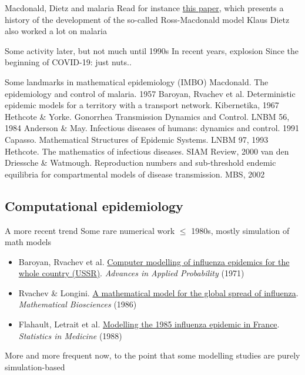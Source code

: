 \documentclass[aspectratio=169]{beamer}\usepackage[]{graphicx}\usepackage[]{xcolor}
\begin{document}
\begin{frame}{Macdonald, Dietz and malaria}
\bbullet Read for instance \href{https://doi.org/10.1371/journal.ppat.1002588}{this paper}, which presents a history of the development of the so-called Ross-Macdonald model
\vfill
\bbullet Klaus Dietz also worked a lot on malaria
\end{frame}
    
    
\begin{frame}{Some activity later, but not much until 1990s}
\bbullet In recent years, explosion
\vfill
\bbullet Since the beginning of COVID-19: just nuts..
\end{frame}

\begin{frame}{Some landmarks in mathematical epidemiology (IMBO)}
\bbullet Macdonald. The epidemiology and control of malaria. 1957
\vfill
\bbullet Baroyan, Rvachev et al. Deterministic epidemic models for a territory with a transport network. Kibernetika, 1967
\vfill
\bbullet Hethcote \& Yorke. Gonorrhea Transmission Dynamics and Control. LNBM 56, 1984
\vfill
\bbullet Anderson \& May. Infectious diseases of humans: dynamics and control. 1991
\vfill
\bbullet Capasso. Mathematical Structures of Epidemic Systems. LNBM 97, 1993
\vfill
\bbullet Hethcote. The mathematics of infectious diseases. SIAM Review, 2000
\vfill
\bbullet van den Driessche \& Watmough. Reproduction numbers and sub-threshold endemic equilibria for compartmental models of disease transmission. MBS, 2002      
\end{frame}


\subsection{Computational epidemiology}


\begin{frame}{A more recent trend}
\bbullet Some rare numerical work $\leq$ 1980s, mostly simulation of math models
\begin{itemize}
    \item Baroyan, Rvachev et al. \href{https://doi.org/10.2307/1426167}{Computer modelling of influenza epidemics for the whole country (USSR)}. \emph{Advances in Applied Probability} (1971) 
    \item Rvachev \& Longini. \href{https://doi.org/10.1016/0025-5564(85)90064-1}{A mathematical model for the global spread of influenza}. \emph{Mathematical Biosciences} (1986) 
    \item Flahault, Letrait et al. \href{https://doi.org/10.1002/sim.4780071107}{Modelling the 1985 influenza epidemic in France}. \emph{Statistics in Medicine} (1988)
\end{itemize}
\vfill
\bbullet More and more frequent now, to the point that some modelling studies are purely simulation-based
\end{frame}
\end{document}
